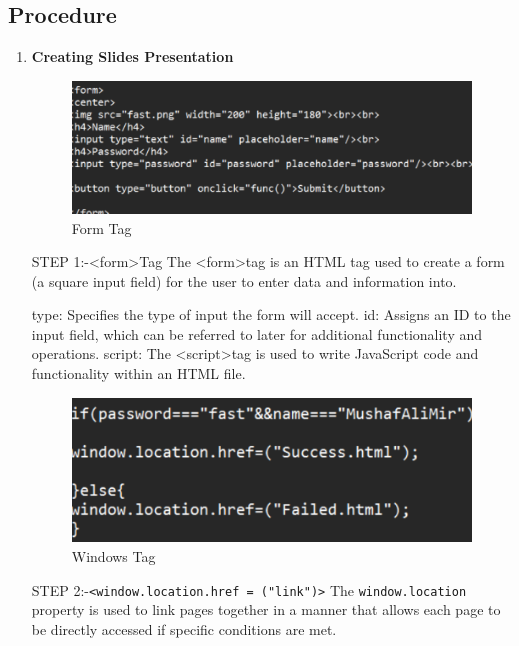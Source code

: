 \documentclass[a4paper,9pt]{article}
\begin{document}
\subsection{Procedure}
\begin{enumerate}
	\item \textbf{Creating Slides Presentation}
	
	\begin{figure}[H]
		\centering
		\includegraphics[width=1\linewidth]{11.1.png}
		\caption{Form Tag}
	\end{figure}
	STEP 1:-\textless form\textgreater Tag
	The \textless form\textgreater tag is an HTML tag used to create a form (a square input field) for the user to enter data and information into.
	
	type: Specifies the type of input the form will accept.
	id: Assigns an ID to the input field, which can be referred to later for additional functionality and operations.
	script: The \textless script\textgreater tag is used to write JavaScript code and functionality within an HTML file.
	\begin{figure}[H]
		\centering
		\includegraphics[width=1\linewidth]{11.2.png}
		\caption{Windows Tag}
	\end{figure}
	STEP 2:-\texttt{\textless window.location.href = ("link")\textgreater}
	The \texttt{window.location} property is used to link pages together in a manner that allows each page to be directly accessed if specific conditions are met.
	

\end{enumerate}
\end{document}
